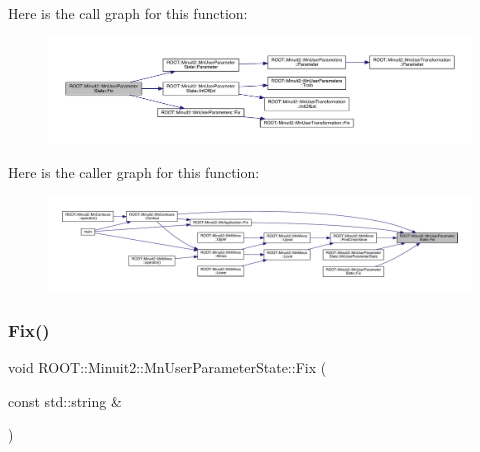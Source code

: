 Here is the call graph for this function\+:\nopagebreak
\begin{figure}[H]
\begin{center}
\leavevmode
\includegraphics[width=350pt]{d3/de0/classROOT_1_1Minuit2_1_1MnUserParameterState_a89b898660495dd7fb95bb1c398941e17_cgraph}
\end{center}
\end{figure}
Here is the caller graph for this function\+:\nopagebreak
\begin{figure}[H]
\begin{center}
\leavevmode
\includegraphics[width=350pt]{d3/de0/classROOT_1_1Minuit2_1_1MnUserParameterState_a89b898660495dd7fb95bb1c398941e17_icgraph}
\end{center}
\end{figure}
\mbox{\label{classROOT_1_1Minuit2_1_1MnUserParameterState_a9d24e3eed7080907f4368e87e8770dcd}} 
\subsubsection{\texorpdfstring{Fix()}{Fix()}\hspace{0.1cm}{\footnotesize\ttfamily [3/4]}}
{\footnotesize\ttfamily void R\+O\+O\+T\+::\+Minuit2\+::\+Mn\+User\+Parameter\+State\+::\+Fix (\begin{DoxyParamCaption}\item[{const std\+::string \&}]{ }\end{DoxyParamCaption})}

\mbox{\label{classROOT_1_1Minuit2_1_1MnUserParameterState_a9d24e3eed7080907f4368e87e8770dcd}} 
